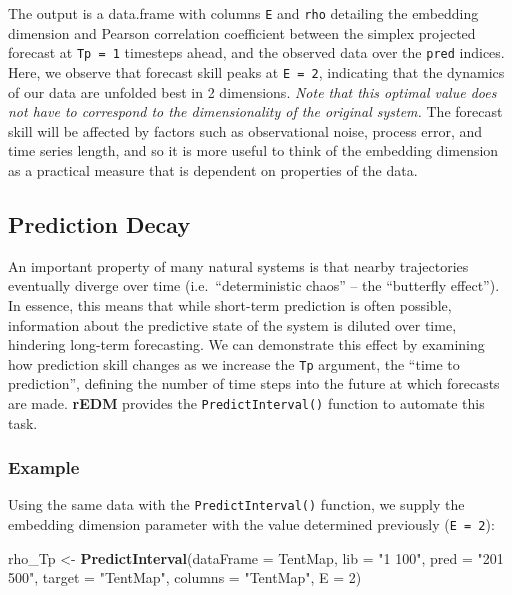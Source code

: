 \documentclass[]{article}
\newenvironment{Shaded}{\begin{snugshade}}{\end{snugshade}}
\newcommand{\DataTypeTok}[1]{\textcolor[rgb]{0.13,0.29,0.53}{#1}}
\newcommand{\DecValTok}[1]{\textcolor[rgb]{0.00,0.00,0.81}{#1}}
\newcommand{\KeywordTok}[1]{\textcolor[rgb]{0.13,0.29,0.53}{\textbf{#1}}}
\newcommand{\NormalTok}[1]{#1}
\newcommand{\StringTok}[1]{\textcolor[rgb]{0.31,0.60,0.02}{#1}}
\begin{document}
The output is a data.frame with columns \texttt{E} and \texttt{rho}
detailing the embedding dimension and Pearson correlation coefficient
between the simplex projected forecast at \texttt{Tp\ =\ 1} timesteps
ahead, and the observed data over the \texttt{pred} indices. Here, we
observe that forecast skill peaks at \texttt{E\ =\ 2}, indicating that
the dynamics of our data are unfolded best in 2 dimensions. \emph{Note
that this optimal value does not have to correspond to the
dimensionality of the original system.} The forecast skill will be
affected by factors such as observational noise, process error, and time
series length, and so it is more useful to think of the embedding
dimension as a practical measure that is dependent on properties of the
data.

\hypertarget{prediction-decay}{%
\subsection{Prediction Decay}\label{prediction-decay}}

An important property of many natural systems is that nearby
trajectories eventually diverge over time (i.e.~``deterministic chaos''
-- the ``butterfly effect''). In essence, this means that while
short-term prediction is often possible, information about the
predictive state of the system is diluted over time, hindering long-term
forecasting. We can demonstrate this effect by examining how prediction
skill changes as we increase the \texttt{Tp} argument, the ``time to
prediction'', defining the number of time steps into the future at which
forecasts are made. \textbf{rEDM} provides the
\texttt{PredictInterval()} function to automate this task.

\hypertarget{example-1}{%
\subsubsection{Example}\label{example-1}}

Using the same data with the \texttt{PredictInterval()} function, we
supply the embedding dimension parameter with the value determined
previously (\texttt{E\ =\ 2}):

\begin{Shaded}
\begin{Highlighting}[]
\NormalTok{rho_Tp <-}\StringTok{ }\KeywordTok{PredictInterval}\NormalTok{(}\DataTypeTok{dataFrame =}\NormalTok{ TentMap, }\DataTypeTok{lib =} \StringTok{"1 100"}\NormalTok{, }\DataTypeTok{pred =} \StringTok{"201 500"}\NormalTok{, }\DataTypeTok{target =} \StringTok{"TentMap"}\NormalTok{, }
    \DataTypeTok{columns =} \StringTok{"TentMap"}\NormalTok{, }\DataTypeTok{E =} \DecValTok{2}\NormalTok{)}
\end{Highlighting}
\end{Shaded}
\end{document}
